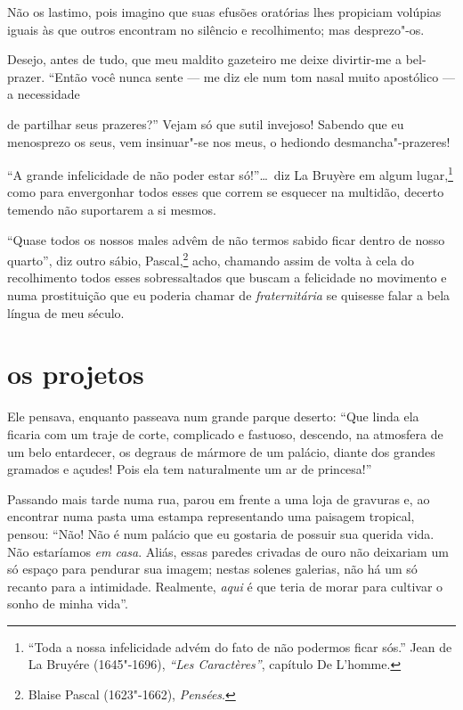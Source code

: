 Não os lastimo, pois imagino que suas efusões oratórias lhes
propiciam volúpias iguais às que outros encontram no silêncio e
recolhimento; mas desprezo"-os.

Desejo, antes de tudo, que meu maldito gazeteiro me deixe divirtir-me a 
bel-prazer. “Então você nunca sente --- me diz ele num
tom nasal muito apostólico --- a necessidade

\quebra

\noindent{}de partilhar seus
prazeres?'' Vejam só que sutil invejoso! Sabendo que eu
menosprezo os seus, vem insinuar"-se nos meus, o hediondo
desmancha"-prazeres!

``A grande infelicidade de não poder estar
só!''\ldots\  diz La Bruyère em algum lugar,\protect\footnote{  ``Toda a 
nossa infelicidade advém do fato de não
podermos ficar sós.'' Jean de La Bruyére (1645"-1696),
\textit{``Les Caractères''}, capítulo De L'homme.} como para
envergonhar todos esses que correm se esquecer na
multidão, decerto temendo não suportarem a si mesmos.

``Quase todos os nossos males advêm de não termos sabido
ficar dentro de nosso quarto'', diz outro sábio,
Pascal,\protect\footnote{  Blaise Pascal (1623"-1662), \textit{Pensées}.}
acho, chamando assim de volta à cela do
recolhimento todos esses sobressaltados que buscam a felicidade 
no movimento e numa prostituição que eu poderia chamar de
\textit{fraternitária} se quisesse falar a bela língua de meu século.

\quebra\section[Os projetos]{os projetos}

Ele pensava, enquanto passeava num grande parque deserto:
``Que linda ela ficaria com um traje de corte, complicado
e fastuoso, descendo, na atmosfera de um belo entardecer, os
degraus de mármore de um palácio, diante dos grandes gramados e açudes!
Pois ela tem naturalmente um ar de princesa!''

Passando mais tarde numa rua, parou em frente a uma loja de gravuras
e, ao encontrar numa pasta uma estampa representando uma paisagem
tropical, pensou: ``Não! Não é num palácio que eu gostaria
de possuir sua querida vida. Não estaríamos \textit{em casa}. Aliás, essas
paredes crivadas de ouro não deixariam um só espaço para pendurar sua
imagem; nestas solenes galerias, não há um só recanto para a
intimidade. Realmente, \textit{aqui} é que teria de morar para cultivar
o sonho de minha vida''.

